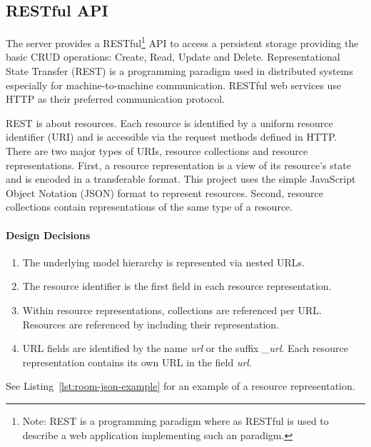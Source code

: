 \subsection{RESTful API}

The server provides a RESTful\footnote{Note: REST is a programming paradigm where as RESTful is used to describe a web application implementing such an paradigm.} API to access a persistent storage providing the basic CRUD operations: Create, Read, Update and Delete.
Representational State Transfer (REST) is a programming paradigm used in distributed systems especially for machine-to-machine communication.
RESTful web services use HTTP as their preferred communication protocol.

REST is about resources.
Each resource is identified by a uniform resource identifier (URI) and is accessible via the request methods defined in HTTP.
There are two major types of URIs, resource collections and resource representations.
First, a resource representation is a view of its resource's state and is encoded in a transferable format.
This project uses the simple JavaScript Object Notation (JSON) format to represent resources.
Second, resource collections contain representations of the same type of a resource.

\paragraph{Design Decisions}

\begin{enumerate}
    \itemsep0em
    \item The underlying model hierarchy is represented via nested URLs.
    \label{enum:design_decision_nested_urls}
    \item The resource identifier is the first field in each resource representation.
    \item Within resource representations, collections are referenced per URL. Resources are referenced by including their representation.
    \label{enum:design_decision_resource_referencing}
    \item URL fields are identified by the name \emph{url} or the suffix \emph{\_url}. Each resource representation contains its own URL in the field \emph{url}.
    \label{enum:design_decision_url_fields_prefix}
\end{enumerate}

See Listing~\ref{lst:room-json-example} for an example of a resource representation.

